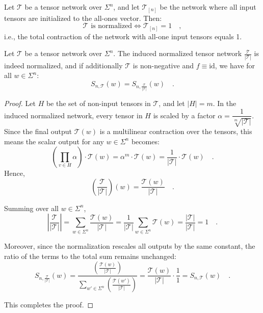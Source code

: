 \documentclass[../../main.tex]{subfiles}
\begin{document}
    \begin{corollary}
        Let $\mathcal{T}$ be a tensor network over $\Sigma^n$, and let $\mathcal{T}_{[n]}$ be the network where all input tensors are initialized to the all-ones vector. Then:
        \[
            \mathcal{T} \text{ is normalized} \iff \mathcal{T}_{[n]} = 1 \quad ,
        \]
        i.e., the total contraction of the network with all-one input tensors equals 1.
    \end{corollary}

    \begin{lemma}
        Let $\mathcal{T}$ be a tensor network over $\Sigma^n$. The induced normalized tensor network $\frac{\mathcal{T}}{|\mathcal{T}|}$ is indeed normalized, and if additionally $\mathcal{T}$ is non-negative and $f \equiv \text{id}$, we have for all $w \in \Sigma^n$:
        \[
            S_{n, \mathcal{T}}(w) = S_{n, \frac{\mathcal{T}}{|\mathcal{T}|}}(w) \quad .
        \]
    \end{lemma}
    \begin{proof}
        Let $H$ be the set of non-input tensors in $\mathcal{T}$, and let $|H| = m$. In the induced normalized network, every tensor in $H$ is scaled by a factor $\alpha = \dfrac{1}{\sqrt[m]{|\mathcal{T}|}}$. Since the final output $\mathcal{T}(w)$ is a multilinear contraction over the tensors, this means the scalar output for any $w \in \Sigma^n$ becomes:
        \[
            \left( \prod_{v \in H} \alpha \right) \cdot \mathcal{T}(w) = \alpha^m \cdot \mathcal{T}(w) = \frac{1}{|\mathcal{T}|} \cdot \mathcal{T}(w) \quad .
        \]
        Hence,
        \[
            \left(\frac{\mathcal{T}}{|\mathcal{T}|}\right)(w) = \frac{\mathcal{T}(w)}{|\mathcal{T}|} \quad .
        \]

        Summing over all \( w \in \Sigma^n \),
        \[
            \left| \frac{\mathcal{T}}{|\mathcal{T}|} \right| = \sum_{w \in \Sigma^n} \frac{\mathcal{T}(w)}{|\mathcal{T}|} = \frac{1}{|\mathcal{T}|} \sum_{w \in \Sigma^n} \mathcal{T}(w) = \frac{|\mathcal{T}|}{|\mathcal{T}|} = 1 \quad .
        \]

        Moreover, since the normalization rescales all outputs by the same constant, the ratio of the terms to the total sum remains unchanged:
        \[
            S_{n, \frac{\mathcal{T}}{|\mathcal{T}|}}(w) = \frac{\left( \frac{\mathcal{T}(w)}{|\mathcal{T}|} \right)}{\sum_{w' \in \Sigma^n} \left( \frac{\mathcal{T}(w')}{|\mathcal{T}|} \right)} = \frac{\mathcal{T}(w)}{|\mathcal{T}|} \cdot \frac{1}{1} = S_{n, \mathcal{T}}(w) \quad .
        \]

        This completes the proof.
    \end{proof}
\end{document}
